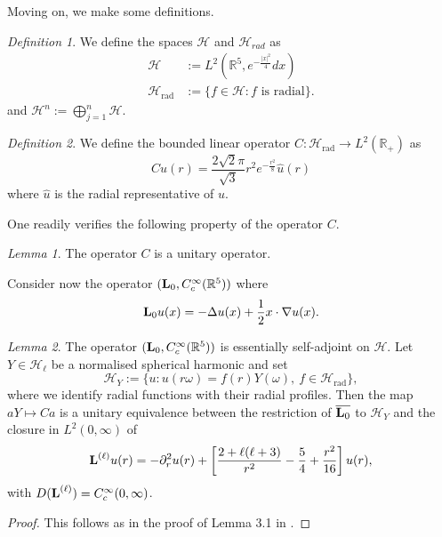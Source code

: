 \documentclass[11pt,reqno]{amsart}
\theoremstyle{remark}
\newtheorem{lem}{Lemma}[section]
\newtheorem{defi}{Definition}[section]
\newcommand{\R}{\mathbb{R}}
\newcommand{\Lf}{\textup{\textbf{L}}}
\theoremstyle{definition}
\begin{document}
Moving on, we make some definitions.
\begin{defi}
We define the spaces $\mathcal{H}$ and $\mathcal{H}_{rad}$ as
\begin{align*}
\mathcal{H}&:= L^2(\R^5, e^{-\frac{|x|^2}{4}}dx)\\
\mathcal{H}_{\mathrm{rad}}&:=\{f\in \mathcal{H}: f \text{ is radial}\}.
\end{align*}
and $\mathcal{H}^n :=\bigoplus_{j=1}^n \mathcal{H}$. 
\end{defi}

\begin{defi}
We define the bounded linear operator $C:\mathcal{H}_{\mathrm{rad}}\to L^2(\R_+)$
as
$$Cu(r)=\frac{2\sqrt{2}\pi}{\sqrt3}r^{2}e^{-\frac{r^2}{8}}\widehat u(r)$$
where $\widehat u$ is the radial representative of $u$.
\end{defi}
One readily verifies the following property of the operator $C$.
\begin{lem}
    The operator $C$ is a unitary operator.
\end{lem}
Consider now the operator $(\Lf_0,C^\infty_{c}(\R^5))$
where 
$$
\Lf_0 u(x)=-\Delta u(x)+\frac{1}{2}x\cdot \nabla u(x).
$$
\begin{lem}
The operator \((\Lf_0,C_c^\infty(\mathbb R^5))\) is essentially self-adjoint on \(\mathcal H\). Let \(Y\in\mathcal H_\ell\) be a normalised spherical harmonic and set
\[
\mathcal H_Y:=\{u:u(r\omega)=f(r)Y(\omega),\ f\in\mathcal H_{\mathrm{rad}}\},
\]
where we identify radial functions with their radial profiles. Then the map \(aY\mapsto Ca\) is a unitary equivalence between the restriction of \(\overline{\Lf_0}\) to \(\mathcal H_Y\) and the closure in \(L^2(0,\infty)\) of
\[
\Lf^{(\ell)} u(r)
=-\partial_r^2 u(r)+\left[\frac{2+\ell(\ell+3)}{r^2}
-\frac54+\frac{r^2}{16}\right] u(r),
\]
with $D(\Lf^{(\ell)})= C^\infty_c(0,\infty)$.
\end{lem}
\begin{proof}
    This follows as in the proof of Lemma 3.1 in 
    \cite{GloSch20}.
\end{proof}
\end{document}
